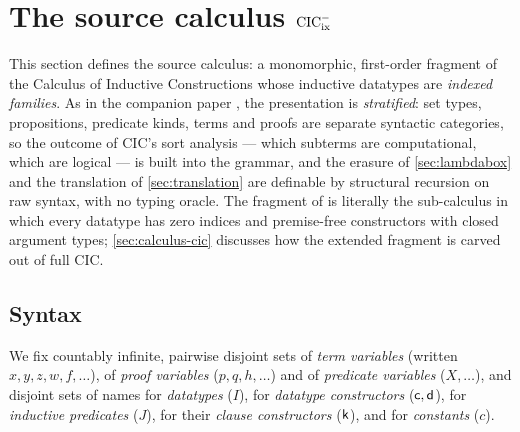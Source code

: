 \section{The source calculus \texorpdfstring{$\mathrm{CIC}^{-}_{\mathrm{ix}}$}{CIC-ix}}
\label{sec:calculus}

This section defines the source calculus: a monomorphic, first-order
fragment of the Calculus of Inductive Constructions whose inductive
datatypes are \emph{indexed families}.  As in the companion paper
\cite{Extraction2026}, the presentation is \emph{stratified}: set types,
propositions, predicate kinds, terms and proofs are separate syntactic
categories, so the outcome of CIC's sort analysis --- which subterms are
computational, which are logical --- is built into the grammar, and the
erasure of \cref{sec:lambdabox} and the translation of
\cref{sec:translation} are definable by structural recursion on raw
syntax, with no typing oracle.  The fragment of \cite{Extraction2026} is
literally the sub-calculus in which every datatype has zero indices and
premise-free constructors with closed argument types;
\cref{sec:calculus-cic} discusses how the extended fragment is carved out
of full CIC.

\subsection{Syntax}
\label{sec:calculus-syntax}

We fix countably infinite, pairwise disjoint sets of \emph{term variables}
(written $x, y, z, w, f, \dots$), of \emph{proof variables} ($p, q, h,
\dots$) and of \emph{predicate variables} ($X, \dots$), and disjoint sets
of names for \emph{datatypes} ($I$), for \emph{datatype constructors}
($\mathsf{c}, \mathsf{d}$), for \emph{inductive predicates} ($J$), for their
\emph{clause constructors} ($\mathsf{k}$), and for \emph{constants} ($c$).

